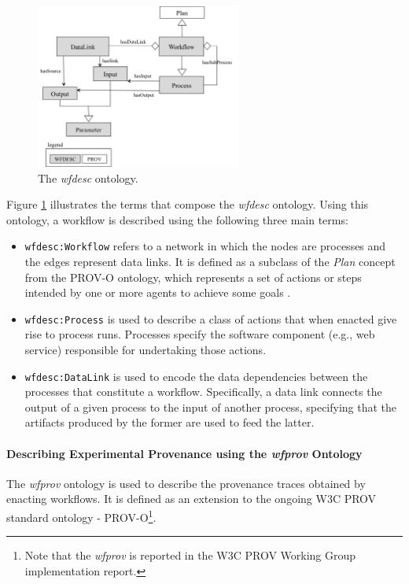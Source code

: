 \begin{figure}[ht]
  \centering
  \includegraphics[width=0.6\textwidth]{Figures/wfdesc.png}
  \caption{The \textit{wfdesc} ontology.}
  \label{fig:wfdesc}
\end{figure}

Figure \ref{fig:wfdesc} illustrates the terms that compose the \textit{wfdesc} ontology. Using this ontology, a workflow is described using the following three main terms:
\begin{itemize}
\item
\texttt{wfdesc:Workflow} refers to a network in which the nodes are processes and the edges represent data links. It is defined as a subclass of the \textit{Plan} concept from the PROV-O ontology, which represents a set of actions or steps intended by one or more agents to achieve some goals \cite{w3c-prov-o}. 
\item
\texttt{wfdesc:Process} is used to describe a class of actions that when enacted give rise to process runs. Processes specify the software component (e.g., web service) responsible for undertaking those actions.
\item
\texttt{wfdesc:DataLink} is used to encode the data dependencies between the processes that constitute a workflow. Specifically, a data link connects the output of a given process to the input of another process, specifying that the artifacts produced by the former are used to feed the latter.
\end{itemize}


\paragraph{Describing Experimental Provenance using the \textit{wfprov} Ontology}
The \textit{wfprov} ontology is used to describe the provenance traces obtained by enacting  workflows. It is defined as an extension to the ongoing W3C PROV standard ontology - PROV-O\footnote{Note that the \textit{wfprov} is reported in the W3C PROV Working Group implementation report.}.

